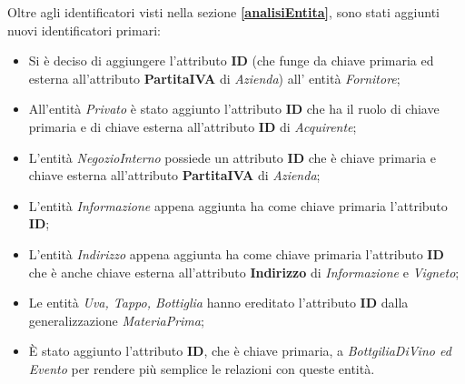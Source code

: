Oltre agli identificatori visti nella sezione \textbf{\ref{analisiEntita}}, sono stati aggiunti nuovi identificatori primari:
\begin{itemize}
	\item Si è deciso di aggiungere l'attributo \textbf{ID} (che funge da chiave primaria ed esterna all'attributo \textbf{PartitaIVA} di \emph{Azienda}) all' entità \emph{Fornitore};
	\item All'entità \emph{Privato} è stato aggiunto l'attributo \textbf{ID} che ha il ruolo di chiave primaria e di chiave esterna all'attributo \textbf{ID} di \emph{Acquirente};
	\item L'entità \emph{NegozioInterno} possiede un attributo \textbf{ID} che è chiave primaria e chiave esterna all'attributo \textbf{PartitaIVA} di \emph{Azienda};
	\item L'entità \emph{Informazione} appena aggiunta ha come chiave primaria l'attributo \textbf{ID};
	\item L'entità \emph{Indirizzo} appena aggiunta ha come chiave primaria l'attributo \textbf{ID} che è anche chiave esterna all'attributo \textbf{Indirizzo} di \emph{Informazione} e \emph{Vigneto};
	\item Le entità \emph{Uva, Tappo, Bottiglia} hanno ereditato l'attributo \textbf{ID} dalla generalizzazione \emph{MateriaPrima};
	\item È stato aggiunto l'attributo \textbf{ID}, che è chiave primaria, a \emph{BottgiliaDiVino ed Evento} per rendere più semplice le relazioni con queste entità.
\end{itemize}
